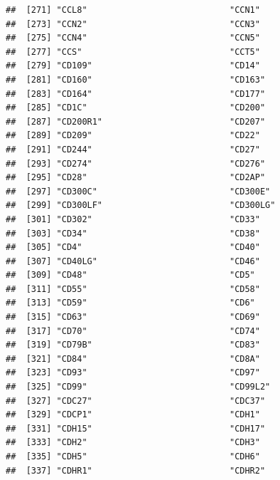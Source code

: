 \documentclass[
]{article}
\begin{document}
\begin{verbatim}
##  [271] "CCL8"                            "CCN1"                           
##  [273] "CCN2"                            "CCN3"                           
##  [275] "CCN4"                            "CCN5"                           
##  [277] "CCS"                             "CCT5"                           
##  [279] "CD109"                           "CD14"                           
##  [281] "CD160"                           "CD163"                          
##  [283] "CD164"                           "CD177"                          
##  [285] "CD1C"                            "CD200"                          
##  [287] "CD200R1"                         "CD207"                          
##  [289] "CD209"                           "CD22"                           
##  [291] "CD244"                           "CD27"                           
##  [293] "CD274"                           "CD276"                          
##  [295] "CD28"                            "CD2AP"                          
##  [297] "CD300C"                          "CD300E"                         
##  [299] "CD300LF"                         "CD300LG"                        
##  [301] "CD302"                           "CD33"                           
##  [303] "CD34"                            "CD38"                           
##  [305] "CD4"                             "CD40"                           
##  [307] "CD40LG"                          "CD46"                           
##  [309] "CD48"                            "CD5"                            
##  [311] "CD55"                            "CD58"                           
##  [313] "CD59"                            "CD6"                            
##  [315] "CD63"                            "CD69"                           
##  [317] "CD70"                            "CD74"                           
##  [319] "CD79B"                           "CD83"                           
##  [321] "CD84"                            "CD8A"                           
##  [323] "CD93"                            "CD97"                           
##  [325] "CD99"                            "CD99L2"                         
##  [327] "CDC27"                           "CDC37"                          
##  [329] "CDCP1"                           "CDH1"                           
##  [331] "CDH15"                           "CDH17"                          
##  [333] "CDH2"                            "CDH3"                           
##  [335] "CDH5"                            "CDH6"                           
##  [337] "CDHR1"                           "CDHR2"                          

\end{verbatim}
\end{document}

